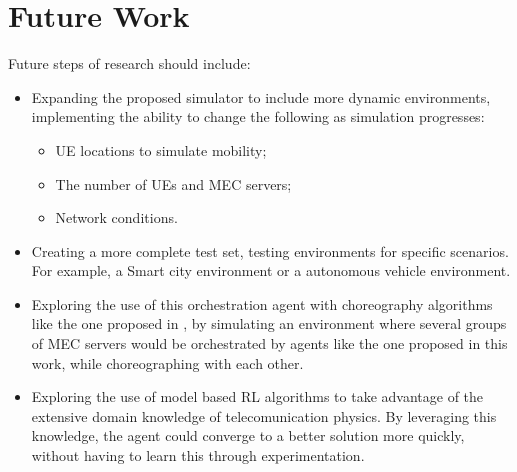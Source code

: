 \section{Future Work}
\noindent Future steps of research should include:
\begin{itemize}
    \item Expanding the proposed simulator to include more dynamic environments, implementing the ability to change the following as simulation progresses:
    \begin{itemize}
      \item \acrshort{UE} locations to simulate mobility;
      \item The number of \acrshort{UE}s and \acrshort{MEC} servers;
      \item Network conditions.
    \end{itemize}
    \item Creating a more complete test set, testing environments for specific scenarios. For example, a Smart city environment or a autonomous vehicle environment. 
    \item Exploring the use of this orchestration agent with choreography algorithms like the one proposed in \cite{Lulu}, by simulating an environment where several groups of \acrshort{MEC} servers would be orchestrated by agents like the one proposed in this work, while choreographing with each other.
    \item Exploring the use of model based \acrshort{RL} algorithms to take advantage of the extensive domain knowledge of telecomunication physics. By leveraging this knowledge, the agent could converge to a better solution more quickly, without having to learn this through experimentation.
\end{itemize}
